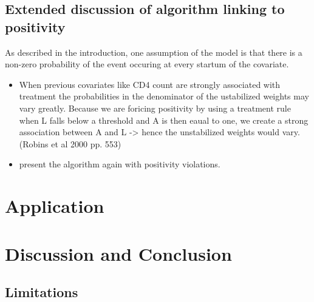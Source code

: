 \documentclass[11pt]{article}
\providecommand{\tightlist}{%
      \setlength{\itemsep}{0pt}\setlength{\parskip}{0pt}}
\begin{document}
\subsection{Extended discussion of algorithm linking to
positivity}\label{extended-discussion-of-algorithm-linking-to-positivity}

As described in the introduction, one assumption of the model is that
there is a non-zero probability of the event occuring at every startum
of the covariate.

\begin{itemize}
\tightlist
\item
  When previous covariates like CD4 count are strongly associated with
  treatment the probabilities in the denominator of the ustabilized
  weights may vary greatly. Because we are foricing positivity by using
  a treatment rule when L falls below a threshold and A is then eaual to
  one, we create a strong association between A and L -\textgreater{}
  hence the unstabilized weights would vary. (Robins et al 2000 pp. 553)
\item
  present the algorithm again with positivity violations.
\end{itemize}

    \section{Application}\label{application}

    \section{Discussion and Conclusion}\label{discussion-and-conclusion}

\subsection{Limitations}\label{limitations}


    
    



    
    
\end{document}
